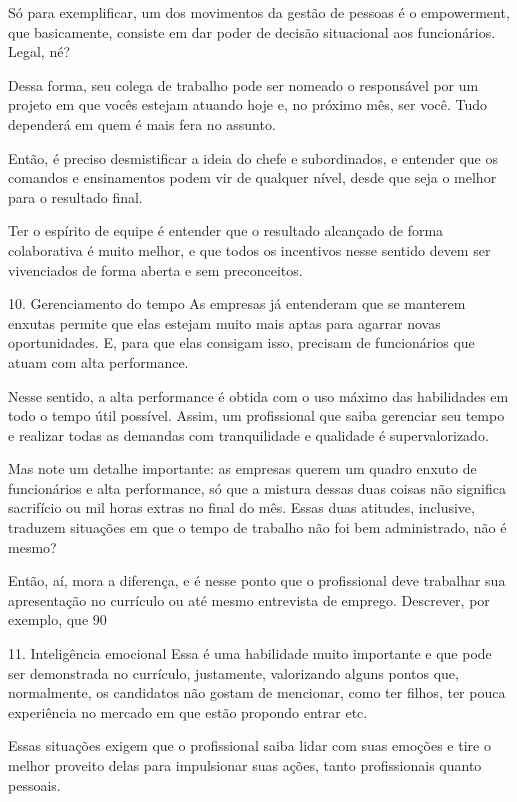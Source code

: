 \begin{commentA}
Só para exemplificar, um dos movimentos da gestão de pessoas é o empowerment, que basicamente, consiste em dar poder de decisão situacional aos funcionários. Legal, né?

Dessa forma, seu colega de trabalho pode ser nomeado o responsável por um projeto em que vocês estejam atuando hoje e, no próximo mês, ser você. Tudo dependerá em quem é mais fera no assunto.

Então, é preciso desmistificar a ideia do chefe e subordinados, e entender que os comandos e ensinamentos podem vir de qualquer nível, desde que seja o melhor para o resultado final.

Ter o espírito de equipe é entender que o resultado alcançado de forma colaborativa é muito melhor, e que todos os incentivos nesse sentido devem ser vivenciados de forma aberta e sem preconceitos.

10. Gerenciamento do tempo
As empresas já entenderam que se manterem enxutas permite que elas estejam muito mais aptas para agarrar novas oportunidades. E, para que elas consigam isso, precisam de funcionários que atuam com alta performance.

Nesse sentido, a alta performance é obtida com o uso máximo das habilidades em todo o tempo útil possível. Assim, um profissional que saiba gerenciar seu tempo e realizar todas as demandas com tranquilidade e qualidade é supervalorizado.

Mas note um detalhe importante: as empresas querem um quadro enxuto de funcionários e alta performance, só que a mistura dessas duas coisas não significa sacrifício ou mil horas extras no final do mês. Essas duas atitudes, inclusive, traduzem situações em que o tempo de trabalho não foi bem administrado, não é mesmo?

Então, aí, mora a diferença, e é nesse ponto que o profissional deve trabalhar sua apresentação no currículo ou até mesmo entrevista de emprego. Descrever, por exemplo, que 90%

11. Inteligência emocional
Essa é uma habilidade muito importante e que pode ser demonstrada no currículo, justamente, valorizando alguns pontos que, normalmente, os candidatos não gostam de mencionar, como ter filhos, ter pouca experiência no mercado em que estão propondo entrar etc.

Essas situações exigem que o profissional saiba lidar com suas emoções e tire o melhor proveito delas para impulsionar suas ações, tanto profissionais quanto pessoais.


\end{commentA}
